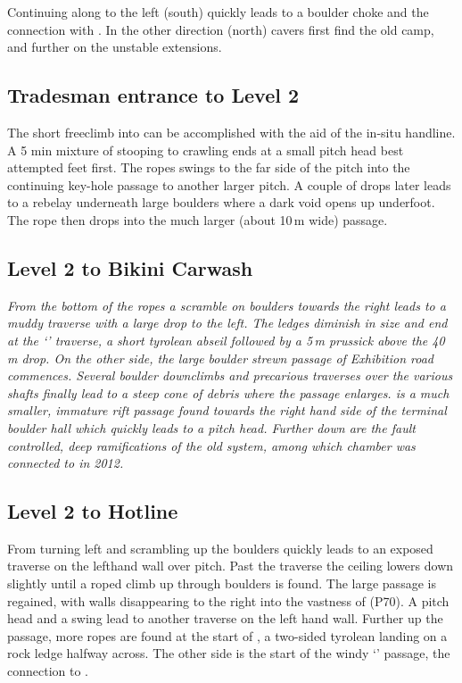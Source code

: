  Continuing along  to the left (south) quickly leads to a boulder choke and the connection with . In the other direction (north) cavers first find the old  camp, and further on the unstable  extensions.

\subsection{Tradesman entrance to Level 2}
The short freeclimb into  can be accomplished with the aid of the in-situ handline. A 5 min mixture of stooping to crawling ends at a small pitch head best attempted feet first. The ropes swings to the far side of the pitch into the continuing key-hole passage  to another larger pitch. A couple of drops later leads to a rebelay underneath large boulders where a dark void opens up underfoot. The rope then drops into the much larger (about 10\,m wide)  passage.

\subsection{Level 2 to Bikini Carwash}
\textit{From the bottom of the  ropes a scramble on boulders towards the right leads to a muddy traverse with a large drop to the left. The ledges diminish in size and end at the `\protect{}' traverse, a short tyrolean abseil followed by a 5\,m prussick above the 40\,m drop. On the other side, the large boulder strewn passage of Exhibition road commences. Several boulder downclimbs and precarious traverses over the various shafts finally lead to a steep cone of debris where the passage enlarges.  is a much smaller, immature rift passage found towards the right hand side of the terminal boulder hall which quickly leads to a pitch head. Further down are the fault controlled, deep ramifications of the old system, among which  chamber was connected to  in 2012.}

\subsection{Level 2 to  Hotline}
From  turning left and scrambling up the boulders quickly leads to an exposed traverse on the lefthand wall over  pitch. Past the traverse the ceiling lowers down slightly until a roped climb up through boulders is found. The large passage is regained, with walls disappearing to the right into the vastness of  (P70). A pitch head and a swing lead to another traverse on the left hand wall. Further up the passage, more ropes are found at the start of , a two-sided tyrolean landing on a rock ledge halfway across. The other side is the start of the windy `' passage, the connection to .

